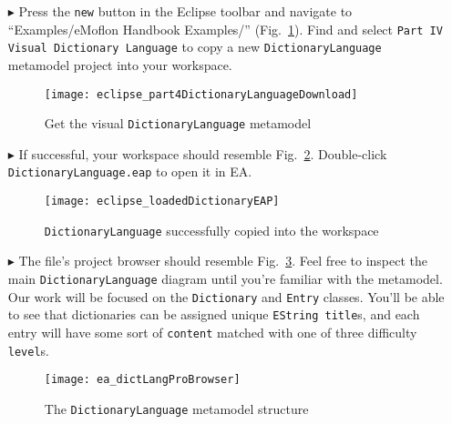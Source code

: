 \begin{itemize}

\item[$\blacktriangleright$] Press the \texttt{new} button in the Eclipse toolbar and navigate to ``Examples/eMoflon Handbook Examples/''
(Fig.~\ref{eclipse:dictionaryDownloadWizard}). Find and select \texttt{Part IV Visual Dictionary Language} to copy a new \texttt{Dict\-ion\-ary\-Lang\-uage}
metamodel project into your workspace.

\vspace{0.5cm}

\begin{figure}[htbp]
\begin{center}
  \texttt{[image: eclipse\_part4DictionaryLanguageDownload]}
  \caption{Get the visual \texttt{DictionaryLanguage} metamodel}
  \label{eclipse:dictionaryDownloadWizard}
\end{center}
\end{figure}

\item[$\blacktriangleright$] If successful, your workspace should resemble Fig.~\ref{eclipse:loadedDictionaryEAP}. Double-click
\texttt{DictionaryLanguage.eap} to open it in EA.

\newpage

\begin{figure}[htbp]
\begin{center}
  \texttt{[image: eclipse\_loadedDictionaryEAP]}
  \caption{\texttt{DictionaryLanguage} successfully copied into the workspace}
  \label{eclipse:loadedDictionaryEAP}
\end{center}
\end{figure}

\item[$\blacktriangleright$] The file's project browser should resemble Fig.~\ref{ea:dictionaryLangStart}. Feel free to inspect the main
\texttt{DictionaryLanguage} diagram until you're familiar with the metamodel. Our work will be focused on the \texttt{Dictionary} and \texttt{Entry} classes.
You'll be able to see that dictionaries can be assigned unique \texttt{EString title}s, and each entry will have some sort of \texttt{content} matched with one
of three difficulty \texttt{level}s.

\vspace{0.5cm}

\begin{figure}[htbp]
\begin{center}
  \texttt{[image: ea\_dictLangProBrowser]}
  \caption{The \texttt{DictionaryLanguage} metamodel structure}
  \label{ea:dictionaryLangStart}
\end{center}
\end{figure}


\end{itemize}
